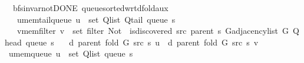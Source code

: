 \begin{isabellebody}
{\isafoldproof}%
%
\isadelimproof
\isanewline
%
\endisadelimproof
\isanewline
{}\isamarkupfalse%
\ {\isacharparenleft}{\kern0pt}\ bfs{\isacharunderscore}{\kern0pt}invar{\isacharunderscore}{\kern0pt}not{\isacharunderscore}{\kern0pt}DONE{\isacharparenright}{\kern0pt}\ queue{\isacharunderscore}{\kern0pt}sorted{\isacharunderscore}{\kern0pt}wrt{\isacharunderscore}{\kern0pt}d{\isacharunderscore}{\kern0pt}fold{\isacharunderscore}{\kern0pt}aux{\isacharcolon}{\kern0pt}\isanewline
\ \ \ u{\isacharunderscore}{\kern0pt}mem{\isacharunderscore}{\kern0pt}tail{\isacharunderscore}{\kern0pt}queue{\isacharcolon}{\kern0pt}\ {\isachardoublequoteopen}u\ {\isasymin}\ set\ {\isacharparenleft}{\kern0pt}Q{\isacharunderscore}{\kern0pt}list\ {\isacharparenleft}{\kern0pt}Q{\isacharunderscore}{\kern0pt}tail\ {\isacharparenleft}{\kern0pt}queue\ s{\isacharparenright}{\kern0pt}{\isacharparenright}{\kern0pt}{\isacharparenright}{\kern0pt}{\isachardoublequoteclose}\isanewline
\ \ \ v{\isacharunderscore}{\kern0pt}mem{\isacharunderscore}{\kern0pt}filter{\isacharcolon}{\kern0pt}\ {\isachardoublequoteopen}v\ {\isasymin}\ set\ {\isacharparenleft}{\kern0pt}filter\ {\isacharparenleft}{\kern0pt}Not\ {\isasymcirc}\ is{\isacharunderscore}{\kern0pt}discovered\ src\ {\isacharparenleft}{\kern0pt}parent\ s{\isacharparenright}{\kern0pt}{\isacharparenright}{\kern0pt}\ {\isacharparenleft}{\kern0pt}G{\isachardot}{\kern0pt}adjacency{\isacharunderscore}{\kern0pt}list\ G\ {\isacharparenleft}{\kern0pt}Q{\isacharunderscore}{\kern0pt}head\ {\isacharparenleft}{\kern0pt}queue\ s{\isacharparenright}{\kern0pt}{\isacharparenright}{\kern0pt}{\isacharparenright}{\kern0pt}{\isacharparenright}{\kern0pt}{\isachardoublequoteclose}\isanewline
\ \ \ {\isachardoublequoteopen}d\ {\isacharparenleft}{\kern0pt}parent\ {\isacharparenleft}{\kern0pt}fold\ G\ src\ s{\isacharparenright}{\kern0pt}{\isacharparenright}{\kern0pt}\ u\ {\isasymle}\ d\ {\isacharparenleft}{\kern0pt}parent\ {\isacharparenleft}{\kern0pt}fold\ G\ src\ s{\isacharparenright}{\kern0pt}{\isacharparenright}{\kern0pt}\ v{\isachardoublequoteclose}\isanewline
%
\isadelimproof
%
\endisadelimproof
%
\isatagproof
{}\isamarkupfalse%
\ {\isacharminus}{\kern0pt}\isanewline
\ \ \isamarkupfalse%
\ u{\isacharunderscore}{\kern0pt}mem{\isacharunderscore}{\kern0pt}queue{\isacharcolon}{\kern0pt}\ {\isachardoublequoteopen}u\ {\isasymin}\ set\ {\isacharparenleft}{\kern0pt}Q{\isacharunderscore}{\kern0pt}list\ {\isacharparenleft}{\kern0pt}queue\ s{\isacharparenright}{\kern0pt}{\isacharparenright}{\kern0pt}{\isachardoublequoteclose}\isanewline

\end{isabellebody}
